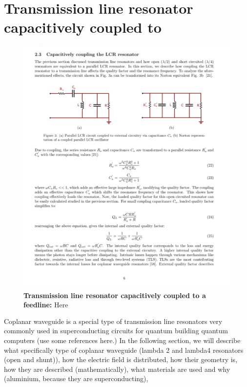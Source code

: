     \section{Transmission line resonator capacitively coupled to}
        \begin{figure} [h]
            \centering
                \includegraphics[width = 13cm]{Images/Transmission line resonator capacitively coupled to a feedline.png}
                \caption[Transmission line resonator capacitively coupled to a feedline]{\textbf{Transmission line resonator capacitively coupled to a feedline:} Here}
                \label{LC circuit capacitively coupled to feedline}
        \end{figure}
    Coplanar waveguide is a special type of transmission line resonators very commonly used in superconducting circuits for quantum building quantum computers (use some references here.) In the following section, we will describe what specifically type of coplanar waveguide (lambda 2 and lambda4 resonators (open and shunt)), how the electric field is distributed, how their geometry is, how they are described (mathematically), what materials are used and why (aluminium, because they are superconducting), 

